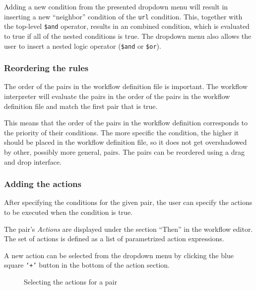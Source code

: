 Adding a new condition from the presented dropdown menu will result in inserting a new ``neighbor'' condition of the \texttt{url} condition.
This, together with the top-level \texttt{\$and} operator, results in an combined condition, which is evaluated to true if all of the nested conditions is true.
The dropdown menu also allows the user to insert a nested logic operator (\texttt{\$and} or \texttt{\$or}).

\subsubsection{Reordering the rules}
    The order of the pairs in the workflow definition file is important.
    The workflow interpreter will evaluate the pairs in the order of the pairs in the workflow definition file and match the first pair that is true.

    This means that the order of the pairs in the workflow definition corresponds to the priority of their conditions.
    The more specific the condition, the higher it should be placed in the workflow definition file, so it does not get overshadowed by other, possibly more general, pairs.
    The pairs can be reordered using a drag and drop interface.

\subsubsection{Adding the actions}
After specifying the conditions for the given pair, the user can specify the actions to be executed when the condition is true.

The pair's \textit{Actions} are displayed under the section ``Then'' in the workflow editor.
The set of actions is defined as a list of parametrized action expressions.

A new action can be selected from the dropdown menu by clicking the blue square \texttt{`+'} button in the bottom of the action section.

\begin{figure}[!h]
    \begin{center}
    \end{center}
    \caption{Selecting the actions for a pair}\label{fig:tutorialActions}
\end{figure}

